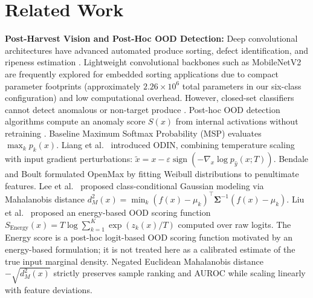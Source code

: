 \section{Related Work}
\label{sec:related_work}

\noindent\textbf{Post-Harvest Vision and Post-Hoc OOD Detection:} Deep convolutional architectures have advanced automated produce sorting, defect identification, and ripeness estimation \cite{rizzo2023fruit,zhang2024fruit,chen2024classification,gulzar2023fruit}. Lightweight convolutional backbones such as MobileNetV2 \cite{sandler2018mobilenetv2} are frequently explored for embedded sorting applications \cite{chen2024classification,gulzar2023fruit} due to compact parameter footprints (approximately $2.26\times 10^6$ total parameters in our six-class configuration) and low computational overhead. However, closed-set classifiers cannot detect anomalous or non-target produce \cite{guo2017calibration}. Post-hoc OOD detection algorithms compute an anomaly score $S(x)$ from internal activations without retraining \cite{yang2024generalized}. Baseline Maximum Softmax Probability (MSP) \cite{hendrycks2017baseline} evaluates $\max_k p_k(x)$. Liang et al.\ \cite{liang2018enhancing} introduced ODIN, combining temperature scaling with input gradient perturbations: $\tilde{x} = x - \varepsilon \operatorname{sign}(-\nabla_x \log p_{\hat{y}}(x; T))$. Bendale and Boult \cite{bendale2016towards} formulated OpenMax by fitting Weibull distributions to penultimate features. Lee et al.\ \cite{lee2018simple} proposed class-conditional Gaussian modeling via Mahalanobis distance $d_M^2(x) = \min_k (f(x) - \mu_k)^\top \mathbf{\Sigma}^{-1} (f(x) - \mu_k)$. Liu et al.\ \cite{liu2020energy} proposed an energy-based OOD scoring function $S_{\text{Energy}}(x) = T \log \sum_{k=1}^K \exp(z_k(x)/T)$ computed over raw logits. The Energy score is a post-hoc logit-based OOD scoring function motivated by an energy-based formulation; it is not treated here as a calibrated estimate of the true input marginal density. Negated Euclidean Mahalanobis distance $-\sqrt{d_M^2(x)}$ strictly preserves sample ranking and AUROC while scaling linearly with feature deviations.

